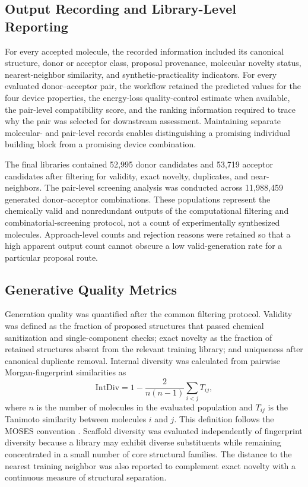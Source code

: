 \documentclass[12pt]{article}
\begin{document}
\subsection{Output Recording and Library-Level Reporting}
For every accepted molecule, the recorded information included its canonical structure, donor or acceptor class, proposal provenance, molecular novelty status, nearest-neighbor similarity, and synthetic-practicality indicators. For every evaluated donor--acceptor pair, the workflow retained the predicted values for the four device properties, the energy-loss quality-control estimate when available, the pair-level compatibility score, and the ranking information required to trace why the pair was selected for downstream assessment. Maintaining separate molecular- and pair-level records enables distinguishing a promising individual building block from a promising device combination.

The final libraries contained 52{,}995 donor candidates and 53{,}719 acceptor candidates after filtering for validity, exact novelty, duplicates, and near-neighbors. The pair-level screening analysis was conducted across 11{,}988{,}459 generated donor--acceptor combinations. These populations represent the chemically valid and nonredundant outputs of the computational filtering and combinatorial-screening protocol, not a count of experimentally synthesized molecules. Approach-level counts and rejection reasons were retained so that a high apparent output count cannot obscure a low valid-generation rate for a particular proposal route.

\subsection{Generative Quality Metrics}
Generation quality was quantified after the common filtering protocol. Validity was defined as the fraction of proposed structures that passed chemical sanitization and single-component checks; exact novelty as the fraction of retained structures absent from the relevant training library; and uniqueness after canonical duplicate removal. Internal diversity was calculated from pairwise Morgan-fingerprint similarities as
\begin{equation}
\mathrm{IntDiv}=1-\frac{2}{n(n-1)}\sum_{i<j}T_{ij},
\end{equation}
where $n$ is the number of molecules in the evaluated population and $T_{ij}$ is the Tanimoto similarity between molecules $i$ and $j$. This definition follows the MOSES convention \cite{moses}. Scaffold diversity was evaluated independently of fingerprint diversity because a library may exhibit diverse substituents while remaining concentrated in a small number of core structural families. The distance to the nearest training neighbor was also reported to complement exact novelty with a continuous measure of structural separation.
\end{document}
